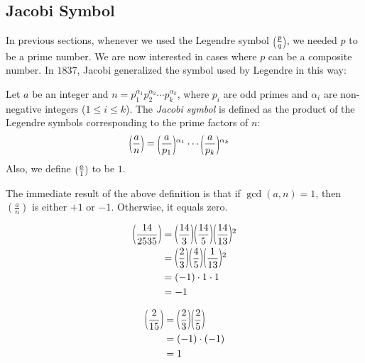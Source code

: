 \documentclass[main.tex]{subfile}
\begin{document}
	\subsection{Jacobi Symbol}
	In previous sections, whenever we used the Legendre symbol $\parenthesis{\frac{p}{q}}$, we needed $p$ to be a prime number. We are now interested in cases where $p$ can be a composite number. In $1837$, Jacobi generalized the symbol used by Legendre in this way:

	\begin{definition}\label{def:jacobi}
		Let $a$ be an integer and $n=p_1^{\alpha_1}p_2^{\alpha_2}\cdots p_k^{\alpha_k}$, where $p_i$ are odd primes and $\alpha_i$ are non-negative integers ($1 \leq i \leq k$). The \textit{Jacobi symbol} is defined as the product of the Legendre symbols corresponding to the prime factors of $n$:
		\begin{align*}
			\parenthesis{\frac{a}{n}}
				& = \parenthesis{\frac{a}{p_1}}^{\alpha_1}\cdots \parenthesis{\frac{a}{p_k}}^{\alpha_k}
		\end{align*}
		Also, we define $\parenthesis{\frac{a}{1}}$ to be $1$.
	\end{definition}

	\begin{remark}
			The immediate result of the above definition is that if $\gcd(a,n) = 1$, then $\left(\frac{a}{n}\right)$ is either $+1$ or $-1$. Otherwise, it equals zero.
	\end{remark}

	\begin{example}
		\begin{align*}
		\parenthesis{\frac{14}{2535}} &= \parenthesis{\frac{14}{3}}\parenthesis{\frac{14}{5}} \parenthesis{\frac{14}{13}}^{2}\\
		&= \parenthesis{\frac{2}{3}}\parenthesis{\frac{4}{5}} \parenthesis{\frac{1}{13}}^{2}\\
		&= (-1) \cdot 1 \cdot 1\\
		&= -1
		\end{align*}
	\end{example}

	\begin{example}
		\begin{align*}
			\parenthesis{\frac{2}{15}}
				& = \parenthesis{\frac{2}{3}}\parenthesis{\frac{2}{5}}\\
				& = (-1)\cdot (-1)\\
				& =1
		\end{align*}

	\end{example}
\end{document}
